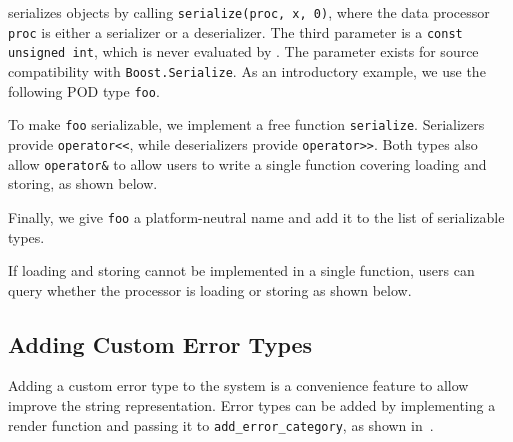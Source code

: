 \lib serializes objects by calling \lstinline^serialize(proc, x, 0)^, where the data processor \lstinline^proc^ is either a serializer or a deserializer. The third parameter is a \lstinline^const unsigned int^, which is never evaluated by \lib. The parameter exists for source compatibility with \lstinline^Boost.Serialize^. As an introductory example, we use the following POD type \lstinline^foo^.



To make \lstinline^foo^ serializable, we implement a free function \lstinline^serialize^. Serializers provide \lstinline^operator<<^, while deserializers provide \lstinline^operator>>^. Both types also allow \lstinline^operator&^ to allow users to write a single function covering loading and storing, as shown below.



Finally, we give \lstinline^foo^ a platform-neutral name and add it to the list of serializable types.



If loading and storing cannot be implemented in a single function, users can query whether the processor is loading or storing as shown below.



\subsection{Adding Custom Error Types}

Adding a custom error type to the system is a convenience feature to allow improve the string representation. Error types can be added by implementing a render function and passing it to \lstinline{add_error_category}, as shown in~.

